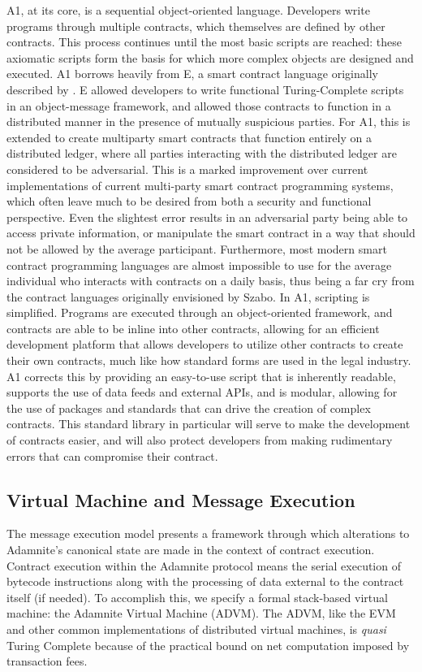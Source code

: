 \documentclass[conference]{IEEEtran}
\begin{document}
A1, at its core, is a sequential object-oriented language. Developers write programs through multiple contracts, which themselves are defined by other contracts. This process continues until the most basic scripts are reached: these axiomatic scripts form the basis for which more complex objects are designed and executed. A1 borrows heavily from E, a smart contract language originally described by \cite{miller1997E}. E allowed developers to write functional Turing-Complete scripts in an object-message framework, and allowed those contracts to function in a distributed manner in the presence of mutually suspicious parties. For A1, this is extended to create multiparty smart contracts that function entirely on a distributed ledger, where all parties interacting with the distributed ledger are considered to be adversarial. This is a marked improvement over current implementations of current multi-party smart contract programming systems,  which often leave much to be desired from both a security and functional perspective. Even the slightest error results in an adversarial party being able to access  private information, or manipulate the smart contract in a way that should not be allowed by the average participant. Furthermore, most modern smart contract programming languages are almost impossible to use for the average individual who interacts with contracts on a daily basis, thus being a far cry from the contract languages originally envisioned by Szabo. In A1, scripting is simplified. Programs are executed through an object-oriented framework, and contracts are able to be inline into other contracts, allowing for an efficient development platform that allows developers to utilize other contracts to create their own contracts, much like how standard forms are used in the legal industry.\\

A1 corrects this by providing an easy-to-use script that is inherently readable, supports the use of data feeds and external APIs, and is modular, allowing for the use of packages and standards that can drive the creation of complex contracts. This standard library in particular will serve to make the development of contracts easier, and will also protect developers from making rudimentary errors that can compromise their contract. 


\subsection{Virtual Machine and Message Execution}
The message execution model presents a framework through which alterations to Adamnite's canonical state are made in the context of contract execution. Contract execution within the Adamnite protocol means the serial execution of bytecode instructions along with the processing of data external to the contract itself (if needed). To accomplish this, we specify a formal stack-based virtual machine: the Adamnite Virtual Machine (ADVM). The ADVM, like the EVM and other common implementations of distributed virtual machines, is \emph{quasi} Turing Complete because of the practical bound on net computation imposed by transaction fees. 
\end{document}
